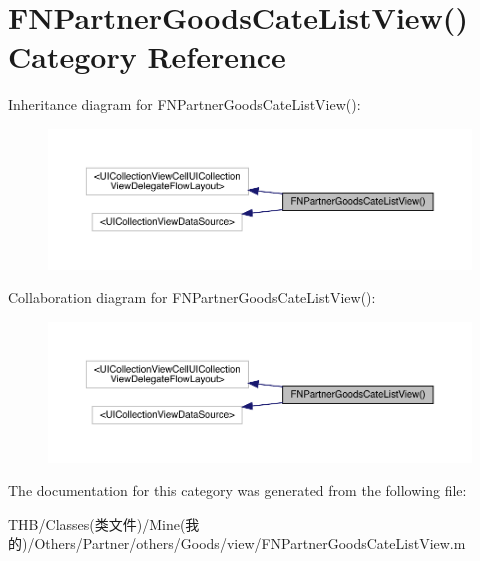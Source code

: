 \hypertarget{category_f_n_partner_goods_cate_list_view_07_08}{}\section{F\+N\+Partner\+Goods\+Cate\+List\+View() Category Reference}
\label{category_f_n_partner_goods_cate_list_view_07_08}


Inheritance diagram for F\+N\+Partner\+Goods\+Cate\+List\+View()\+:\nopagebreak
\begin{figure}[H]
\begin{center}
\leavevmode
\includegraphics[width=350pt]{category_f_n_partner_goods_cate_list_view_07_08__inherit__graph}
\end{center}
\end{figure}


Collaboration diagram for F\+N\+Partner\+Goods\+Cate\+List\+View()\+:\nopagebreak
\begin{figure}[H]
\begin{center}
\leavevmode
\includegraphics[width=350pt]{category_f_n_partner_goods_cate_list_view_07_08__coll__graph}
\end{center}
\end{figure}


The documentation for this category was generated from the following file\+:\begin{DoxyCompactItemize}
\item 
T\+H\+B/\+Classes(类文件)/\+Mine(我的)/\+Others/\+Partner/others/\+Goods/view/F\+N\+Partner\+Goods\+Cate\+List\+View.\+m\end{DoxyCompactItemize}

